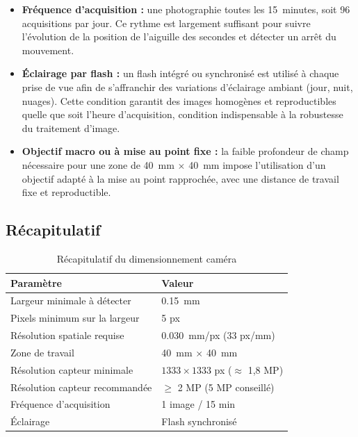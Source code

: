 \begin{itemize}
    \item \textbf{Fréquence d'acquisition :} une photographie toutes les \SI{15}{minutes},
    soit 96 acquisitions par jour. Ce rythme est largement suffisant pour suivre l'évolution
    de la position de l'aiguille des secondes et détecter un arrêt du mouvement.

    \item \textbf{Éclairage par flash :} un flash intégré ou synchronisé est utilisé à chaque
    prise de vue afin de s'affranchir des variations d'éclairage ambiant (jour, nuit, nuages).
    Cette condition garantit des images homogènes et reproductibles quelle que soit l'heure
    d'acquisition, condition indispensable à la robustesse du traitement d'image.

    \item \textbf{Objectif macro ou à mise au point fixe :} la faible profondeur de champ
    nécessaire pour une zone de \SI{40}{mm} $\times$ \SI{40}{mm} impose l'utilisation d'un
    objectif adapté à la mise au point rapprochée, avec une distance de travail fixe et
    reproductible.
\end{itemize}

\subsection{Récapitulatif}

\begin{table}[h]
\centering
\begin{tabular}{ll}
\hline
\textbf{Paramètre} & \textbf{Valeur} \\
\hline
Largeur minimale à détecter & \SI{0.15}{mm} \\
Pixels minimum sur la largeur & 5 px \\
Résolution spatiale requise & \SI{0.030}{mm/px} (33 px/mm) \\
Zone de travail & \SI{40}{mm} $\times$ \SI{40}{mm} \\
Résolution capteur minimale & $1333 \times 1333$ px ($\approx$ 1,8 MP) \\
Résolution capteur recommandée & $\geq$ 2 MP (5 MP conseillé) \\
Fréquence d'acquisition & 1 image / 15 min \\
Éclairage & Flash synchronisé \\
\hline
\end{tabular}
\caption{Récapitulatif du dimensionnement caméra}
\label{tab:camera}
\end{table}
